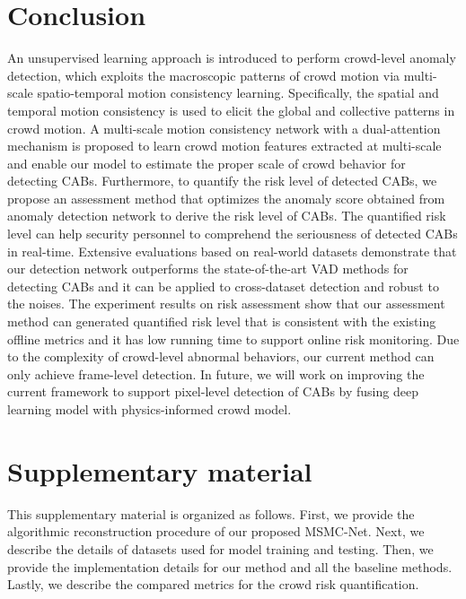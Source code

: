 \documentclass[journal]{IEEEtran}
\begin{document}
\section{Conclusion}
An unsupervised learning approach is introduced to perform crowd-level anomaly detection, which exploits the macroscopic patterns of crowd motion via multi-scale spatio-temporal motion consistency learning. Specifically, the spatial and temporal motion consistency is used to elicit the global and collective patterns in crowd motion. A multi-scale motion consistency network with a dual-attention mechanism is proposed to learn crowd motion features extracted at multi-scale and enable our model to estimate the proper scale of crowd behavior for detecting CABs. Furthermore, to quantify the risk level of detected CABs, we propose an assessment method that optimizes the anomaly score obtained from anomaly detection network to derive the risk level of CABs. The quantified risk level can help security personnel to comprehend the seriousness of detected CABs in real-time. Extensive evaluations based on real-world datasets demonstrate that our detection network outperforms the state-of-the-art VAD methods for detecting CABs and it can be applied to cross-dataset detection and robust to the noises. The experiment results on risk assessment show that our assessment method can generated quantified risk level that is consistent with the existing offline metrics and it has low running time to support online risk monitoring. Due to the complexity of crowd-level abnormal behaviors, our current method can only achieve frame-level detection. In future, we will work on improving the current framework to support pixel-level detection of CABs by fusing deep learning model with physics-informed crowd model.





\clearpage
\thispagestyle{empty}
\section*{Supplementary material}\label{appendix}
\setcounter{figure}{0}
\setcounter{table}{0}
\setcounter{footnote}{0}
\noindent This supplementary material is organized as follows. First, we provide the algorithmic reconstruction procedure of our proposed MSMC-Net. Next, we describe the details of datasets used for model training and testing. Then, we provide the implementation details for our method and all the baseline methods. Lastly, we describe the compared metrics for the crowd risk quantification. 
\end{document}
